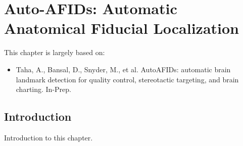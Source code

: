 \chapter{Auto-AFIDs: Automatic Anatomical Fiducial Localization}\label{chap:Autoafids}
\newpage
\sloppy
This chapter is largely based on:
\begin{itemize}[noitemsep,topsep=0pt]
	\item Taha, A., Bansal, D., Snyder, M., et al. AutoAFIDs: automatic brain landmark detection for quality control, stereotactic targeting, and brain charting. In-Prep.
\end{itemize}

\section{Introduction}
Introduction to this chapter.

